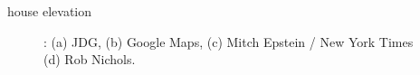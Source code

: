 \begin{block}{house elevation}
\begin{figure}
        \hfill
        \caption{
            : (a) JDG, (b) Google Maps, (c) Mitch Epstein /  New York Times (d) Rob Nichols.
        }
        \label{fig:images}
    \end{figure}
\end{block}